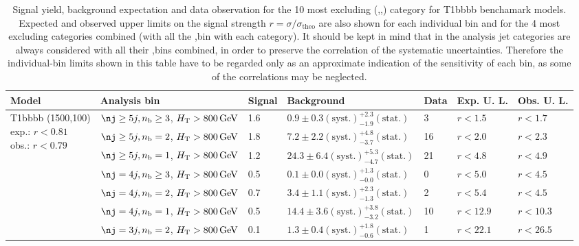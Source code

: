 \clearpage
\begin{table}[h!] 
  \scriptsize
  \caption{ 
  Signal yield, background expectation and data observation for the 10 most excluding (\nj,\nb,\scalht) category for T1bbbb benchamark models. 
  Expected and observed upper limits on the signal strength $r=\sigma/\sigma_{\mathrm{theo}}$ are also shown 
  for each individual bin and for the 4 most excluding \nj categories combined (with all the \nb,\scalht bin with each category).
  It should be kept in mind that in the analysis jet categories are always considered with all their \nb,\scalht bins 
  combined, in order to preserve the correlation of the systematic uncertainties. 
  Therefore the individual-bin limits shown in this table have to be regarded only as an approximate indication 
  of the sensitivity of each bin, as some of the correlations may be neglected.
  \label{tab:sigBenchmarksYields_T1bbbb}}
  \centering 
  \begin{tabular}{ lllllll } 
    \hline 
    \hline 
    Model & Analysis bin & Signal & Background & Data & Exp. U. L. & Obs. U. L. \\ \hline
\multirow{10}{*}{\parbox[t]{2cm}{T1bbbb (1500,100)\\exp.: $r<0.81$\\obs.: $r<0.79$}}
 & $\nj \geq5j,\nb \geq3$, $H_{\mathrm{T}} > 800 \, \mathrm{GeV}$ & 1.6 & $0.9 \pm 0.3 \mathrm{(syst.)} ^{+2.3}_{-1.9} \mathrm{(stat.)}$ & 3 & $r < 1.5$ & $r < 1.7$\\ 
 & $\nj \geq5j,\nb =2$, $H_{\mathrm{T}} > 800 \, \mathrm{GeV}$ & 1.8 & $7.2 \pm 2.2 \mathrm{(syst.)} ^{+4.8}_{-3.7} \mathrm{(stat.)}$ & 16 & $r < 2.0$ & $r < 2.3$\\ 
 & $\nj \geq5j,\nb =1$, $H_{\mathrm{T}} > 800 \, \mathrm{GeV}$ & 1.2 & $24.3 \pm 6.4 \mathrm{(syst.)} ^{+5.3}_{-4.7} \mathrm{(stat.)}$ & 21 & $r < 4.8$ & $r < 4.9$\\ 
 & $\nj =4j,\nb \geq3$, $H_{\mathrm{T}} > 800 \, \mathrm{GeV}$ & 0.5 & $0.1 \pm 0.0 \mathrm{(syst.)} ^{+1.3}_{-0.0} \mathrm{(stat.)}$ & 0 & $r < 5.0$ & $r < 4.5$\\ 
 & $\nj =4j,\nb =2$, $H_{\mathrm{T}} > 800 \, \mathrm{GeV}$ & 0.7 & $3.4 \pm 1.1 \mathrm{(syst.)} ^{+2.3}_{-1.3} \mathrm{(stat.)}$ & 2 & $r < 5.4$ & $r < 4.5$\\ 
 & $\nj =4j,\nb =1$, $H_{\mathrm{T}} > 800 \, \mathrm{GeV}$ & 0.5 & $14.4 \pm 3.6 \mathrm{(syst.)} ^{+3.8}_{-3.2} \mathrm{(stat.)}$ & 10 & $r < 12.9$ & $r < 10.3$\\ 
 & $\nj =3j,\nb =2$, $H_{\mathrm{T}} > 800 \, \mathrm{GeV}$ & 0.1 & $1.3 \pm 0.4 \mathrm{(syst.)} ^{+1.8}_{-0.6} \mathrm{(stat.)}$ & 1 & $r < 22.1$ & $r < 26.5$\\ 

\end{tabular}
\end{table}
